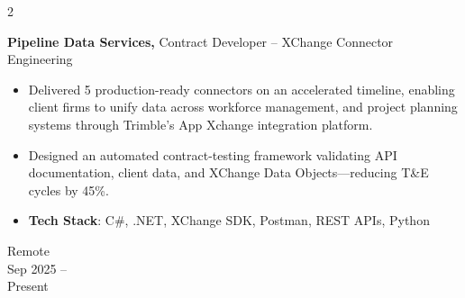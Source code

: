 \documentclass[10pt, letterpaper]{article}
\newenvironment{highlights}{
    \begin{itemize}[
        topsep=0.10 cm,
        parsep=0.10 cm,
        partopsep=0pt,
        itemsep=0pt,
        leftmargin=0.4 cm + 10pt
    ]
}{
    \end{itemize}
} %
\newenvironment{twocolentry}[2][]{
    \onecolentry
    \def\secondColumn{#2}
    \setcolumnwidth{\fill,4 cm}
    \begin{paracol}{2}
}{
    \switchcolumn \raggedleft \secondColumn
    \end{paracol}
    \endonecolentry
} %
\begin{document}
        \begin{twocolentry}{
                Remote\\
                Sep 2025 – \\Present
            }
                \textbf{Pipeline Data Services,}\; Contract Developer – XChange Connector Engineering
                \begin{highlights}
                    \item Delivered 5 production-ready connectors on an accelerated timeline, enabling client firms to unify data across workforce management, and project planning systems through Trimble's App Xchange integration platform.
                    \item Designed an automated contract-testing framework validating API documentation, client data, and XChange Data Objects—reducing T\&E cycles by 45\%.
                    \item \textbf{Tech Stack}: C\#, .NET, XChange SDK, Postman, REST APIs, Python
                \end{highlights}
            \end{twocolentry}
\end{document}
